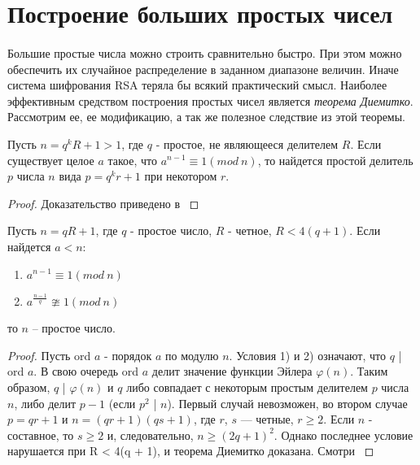 \section{Построение больших простых чисел}

\paragraph{} Большие простые числа можно строить сравнительно быстро. При этом можно обеспечить их случайное распределение в 
заданном диапазоне величин. Иначе система шифрования RSA теряла бы всякий практический смысл. Наиболее эффективным средством 
построения простых чисел является \textit{теорема Диемитко}. Рассмотрим ее, ее модификацию, а так же полезное следствие из этой теоремы.

  \begin{lemma}
    Пусть {$n = q^k R + 1 > 1$}, где {$q$} - простое, не являющееся делителем {$R$}. Если существует целое {$a$} такое, что
    {$a^{n-1} \equiv 1 (mod \: n)$}, то найдется простой делитель {$p$} числа {$n$} вида {$p=q^kr+1$} при некотором {$r$}.
    
      \begin{proof}
	Доказательство приведено в \cite[Пункт 12.3, страница 63]{cherem02}
      \end{proof}

  \end{lemma}


  \begin{theorem}[Диемитко] \label{eq:prime-theorem-diemitko}
      Пусть {$n = q R + 1$}, где {$q$} - простое число, {$R$} - четное, {$R < 4(q + 1)$}. Если найдется {$a < n$}:
      
	\begin{enumerate}
	 \item {$a^{n - 1} \equiv 1(mod \: n)$}
	 \item {$a^{\frac{n - 1}{q}} \ncong 1(mod \: n)$}
	\end{enumerate}
	
      то {$n$} – простое число.
      
      \begin{proof}
	Пусть ord $a$ - порядок $a$ по модулю $n$. Условия 1) и 2) означают, что $q$ | ord $a$. В свою очередь ord $a$ делит значение функции
	Эйлера $\varphi(n)$. Таким образом, $q$ | $\varphi(n)$ и $q$ либо совпадает с некоторым простым делителем $p$ числа $n$, либо делит $p - 1$ 
	(если $p^2$ | $n$). Первый случай невозможен, во втором случае $p = qr + 1$ и $n = (qr + 1)(qs + 1)$, где $r$, $s$ — четные, $r \ge 2$.
	Если $n$ - составное, то $s \ge 2$ и, следовательно, $n \ge (2q + 1)^2$. Однако последнее условие нарушается при R < 4(q + 1), и теорема 
	Диемитко доказана. Смотри \cite[Пункт 12.3, страница 63]{cherem02}
      \end{proof}
  \end{theorem} 
 
